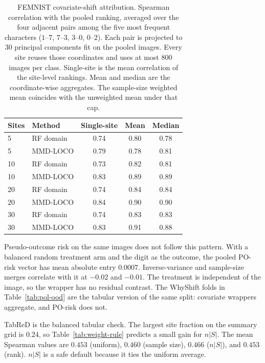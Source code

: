\begin{table}[t]
\centering
\caption{FEMNIST covariate-shift attribution.
Spearman correlation with the pooled ranking, averaged over the four
adjacent pairs among the five most frequent characters
(\(1\)--\(7\), \(7\)--\(3\), \(3\)--\(0\), \(0\)--\(2\)).
Each pair is projected to \(30\) principal components fit on the pooled
images.
Every site reuses those coordinates and uses at most \(800\) images per
class.
Single-site is the mean correlation of the site-level rankings.
Mean and median are the coordinate-wise aggregates.
The sample-size weighted mean coincides with the unweighted mean under
that cap.}
\label{tab:femnist-cs-ood}
\small
\begin{tabular}{llccc}
\toprule
Sites & Method & Single-site & Mean & Median \\
\midrule
5 & RF domain & 0.74 & 0.80 & 0.78 \\
5 & MMD-LOCO & 0.79 & 0.78 & 0.81 \\
10 & RF domain & 0.73 & 0.82 & 0.81 \\
10 & MMD-LOCO & 0.83 & 0.89 & 0.89 \\
20 & RF domain & 0.74 & 0.84 & 0.84 \\
20 & MMD-LOCO & 0.84 & 0.90 & 0.90 \\
30 & RF domain & 0.74 & 0.83 & 0.83 \\
30 & MMD-LOCO & 0.83 & 0.91 & 0.88 \\
\bottomrule
\end{tabular}
\end{table}

Pseudo-outcome risk on the same images does not follow this pattern.
With a balanced random treatment arm and the digit as the outcome, the
pooled PO-risk vector has mean absolute entry \(0.0007\).
Inverse-variance and sample-size merges correlate with it at \(-0.02\) and
\(-0.01\).
The treatment is independent of the image, so the wrapper has no residual
contrast.
The WhyShift folds in Table~\ref{tab:pol-ood} are the tabular version of
the same split: covariate wrappers aggregate, and PO-risk does not.

TabReD is the balanced tabular check.
The largest site fraction on the summary grid is \(0.24\), so
Table~\ref{tab:weight-rule} predicts a small gain for \(n|S|\).
The mean Spearman values are \(0.453\) (uniform), \(0.460\) (sample size),
\(0.466\) (\(n|S|\)), and \(0.453\) (rank).
\(n|S|\) is a safe default because it ties the uniform average.


